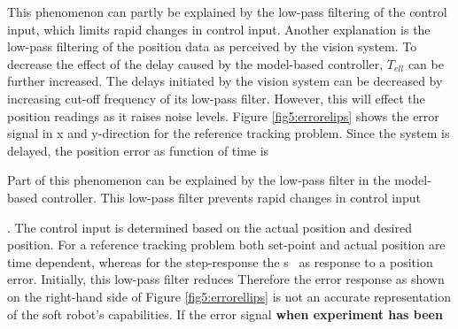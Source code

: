 This phenomenon can partly be explained by the low-pass filtering of the control input, which limits rapid changes in control input. Another explanation is the low-pass filtering of the position data as perceived by the vision system. To decrease the effect of the delay caused by the model-based controller, $T_{ell}$ can be further increased. The delays initiated by the vision system can be decreased by increasing cut-off frequency of its low-pass filter. However, this will effect the position readings as it raises noise levels. Figure \ref{fig5:errorelips} shows the error signal in x and y-direction for the reference tracking problem. Since the system is delayed, the position error as function of time is 

Part of this phenomenon can be explained by the low-pass filter in the model-based controller. This low-pass filter prevents rapid changes in control input

. The control input is determined based on the actual position and desired position. For a reference tracking problem both set-point and actual position are time dependent, whereas for the step-response the s
\
as response to a position error. Initially, this low-pass filter reduces  Therefore the error response as shown on the right-hand side of Figure \ref{fig5:errorellips} is not an accurate representation of the soft robot's capabilities. If the error signal
\textbf{when experiment has been }




